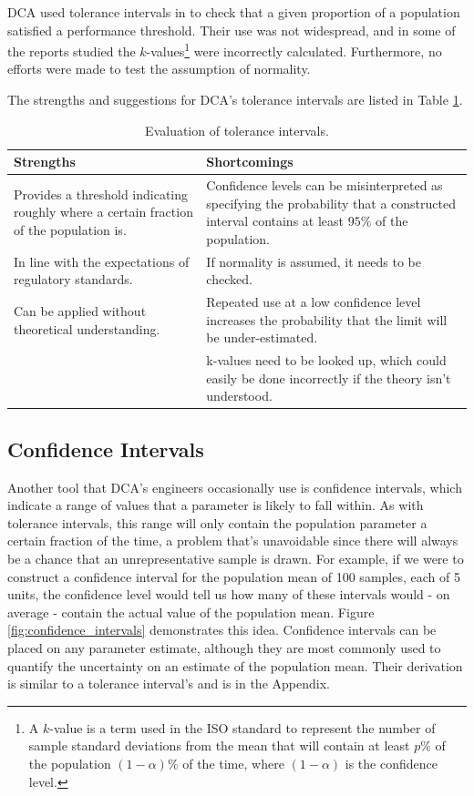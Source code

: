 \documentclass[11pt,a4paper,article]{memoir} %
\begin{document}
DCA used tolerance intervals in to check that a given proportion of a population satisfied a performance threshold. Their use was not widespread, and in some of the reports studied the $k$-values\footnote{A $k$-value is a term used in the ISO standard to represent the number of sample standard deviations from the mean that will contain at least $p\%$ of the population $(1 - \alpha)\%$ of the time, where $(1 - \alpha)$ is the confidence level.} were incorrectly calculated. Furthermore, no efforts were made to test the assumption of normality.

The strengths and suggestions for DCA's tolerance intervals are listed in Table \ref{tab:tol_intervals}.
\begin{table}
\caption{Evaluation of tolerance intervals.}
\small
\hspace*{-.5cm}
\begin{tabular}{p{6.5cm}p{6.5cm}}
\toprule
\textbf{Strengths}	&	\textbf{Shortcomings} \\
\toprule
Provides a threshold indicating roughly where a certain fraction of the population is. & Confidence levels can be misinterpreted as specifying the probability that a constructed interval contains at least $95\%$ of the population. \\
In line with the expectations of regulatory standards. & If normality is assumed, it needs to be checked. \\
Can be applied without theoretical understanding. & Repeated use at a low confidence level increases the probability that the limit will be under-estimated. \\
& k-values need to be looked up, which could easily be done incorrectly if the theory isn't understood.\\
\bottomrule
\end{tabular}
\label{tab:tol_intervals}
\end{table}

\newpage
\subsection*{Confidence Intervals}
Another tool that DCA's engineers occasionally use is confidence intervals, which indicate a range of values that a parameter is likely to fall within. As with tolerance intervals, this range will only contain the population parameter a certain fraction of the time, a problem that's unavoidable since there will always be a chance that an unrepresentative sample is drawn. For example, if we were to construct a confidence interval for the population mean of 100 samples, each of 5 units, the confidence level would tell us how many of these intervals would - on average - contain the actual value of the population mean. Figure \ref{fig:confidence_intervals} demonstrates this idea. Confidence intervals can be placed on any parameter estimate, although they are most commonly used to quantify the uncertainty on an estimate of the population mean. Their derivation is similar to a tolerance interval's and is in the Appendix.
\end{document}
